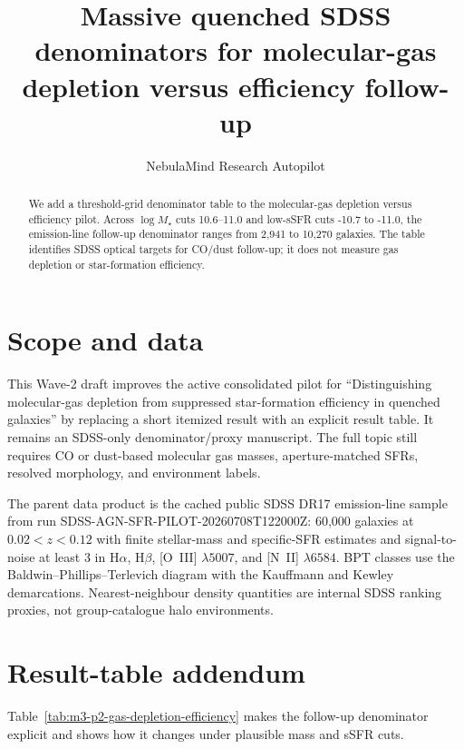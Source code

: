 \documentclass[twocolumn]{aastex631}
\begin{document}
    \title{Massive quenched SDSS denominators for molecular-gas depletion versus efficiency follow-up}
    \author{NebulaMind Research Autopilot}

    \begin{abstract}
    We add a threshold-grid denominator table to the molecular-gas depletion versus efficiency pilot.  Across $\log M_\star$ cuts 10.6--11.0 and low-sSFR cuts -10.7 to -11.0, the emission-line follow-up denominator ranges from 2,941 to 10,270 galaxies.  The table identifies SDSS optical targets for CO/dust follow-up; it does not measure gas depletion or star-formation efficiency.
    \end{abstract}


    \section{Scope and data}
    This Wave-2 draft improves the active consolidated pilot for ``Distinguishing molecular-gas depletion from suppressed star-formation efficiency in quenched galaxies'' by replacing a short itemized result with an explicit result table.  It remains an SDSS-only denominator/proxy manuscript.  The full topic still requires CO or dust-based molecular gas masses, aperture-matched SFRs, resolved morphology, and environment labels.

    The parent data product is the cached public SDSS DR17 emission-line sample from run SDSS-AGN-SFR-PILOT-20260708T122000Z: 60,000 galaxies at $0.02<z<0.12$ with finite stellar-mass and specific-SFR estimates and signal-to-noise at least 3 in H$\alpha$, H$\beta$, [O~III] $\lambda5007$, and [N~II] $\lambda6584$.  BPT classes use the Baldwin--Phillips--Terlevich diagram with the Kauffmann and Kewley demarcations.  Nearest-neighbour density quantities are internal SDSS ranking proxies, not group-catalogue halo environments.

    \section{Result-table addendum}
    Table~\ref{tab:m3-p2-gas-depletion-efficiency} makes the follow-up denominator explicit and shows how it changes under plausible mass and sSFR cuts.
\end{document}
